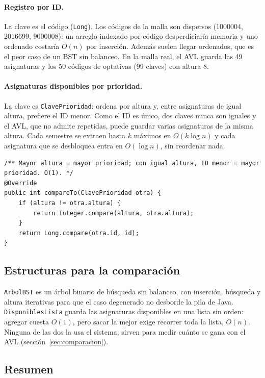 \documentclass[11pt,letterpaper]{article}
\begin{document}
\paragraph{Registro por ID.} La clave es el código (\texttt{Long}). Los códigos de la malla son dispersos (1000004, 2016699, 9000008): un arreglo indexado por código desperdiciaría memoria y uno ordenado costaría $O(n)$ por inserción. Además suelen llegar ordenados, que es el peor caso de un BST sin balanceo. En la malla real, el AVL guarda las 49 asignaturas y los 50 códigos de optativas (99 claves) con altura 8.

\paragraph{Asignaturas disponibles por prioridad.} La clave es \texttt{ClavePrioridad}: ordena por altura y, entre asignaturas de igual altura, prefiere el ID menor. Como el ID es único, dos claves nunca son iguales y el AVL, que no admite repetidas, puede guardar varias asignaturas de la misma altura. Cada semestre se extraen hasta $k$ máximos en $O(k \log n)$ y cada asignatura que se desbloquea entra en $O(\log n)$, sin reordenar nada.
\begin{lstlisting}[style=java]
/** Mayor altura = mayor prioridad; con igual altura, ID menor = mayor prioridad. O(1). */
@Override
public int compareTo(ClavePrioridad otra) {
    if (altura != otra.altura) {
        return Integer.compare(altura, otra.altura);
    }
    return Long.compare(otra.id, id);
}
\end{lstlisting}

\subsection{Estructuras para la comparación}
\texttt{ArbolBST} es un árbol binario de búsqueda sin balanceo, con inserción, búsqueda y altura iterativas para que el caso degenerado no desborde la pila de Java. \texttt{DisponiblesLista} guarda las asignaturas disponibles en una lista sin orden: agregar cuesta $O(1)$, pero sacar la mejor exige recorrer toda la lista, $O(n)$. Ninguna de las dos la usa el sistema; sirven para medir cuánto se gana con el AVL (sección~\ref{sec:comparacion}).

\subsection{Resumen}
\end{document}
